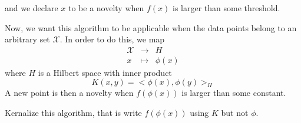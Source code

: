 \documentclass[12pt]{article}
\begin{document}
and we declare $x$ to be a novelty when $f(x)$ is larger than some threshold. 

Now, we want this algorithm to be applicable when the data points belong to an arbitrary set $\mathcal{X}$. 
In order to do this, we map 
\begin{eqnarray*}
\mathcal{X} &\to& H\\
x & \mapsto & \phi(x)
\end{eqnarray*}
where $H$ is a Hilbert space with inner product
\begin{equation}
K(x,y) = <\phi(x),\phi(y)>_H
\end{equation}
A new point is then a novelty when $f\left(\phi(x)\right)$ is larger than some constant. 

Kernalize this algorithm, that is write $f(\phi(x))$ using $K$ but not $\phi$. 
\newpage
\end{document}
